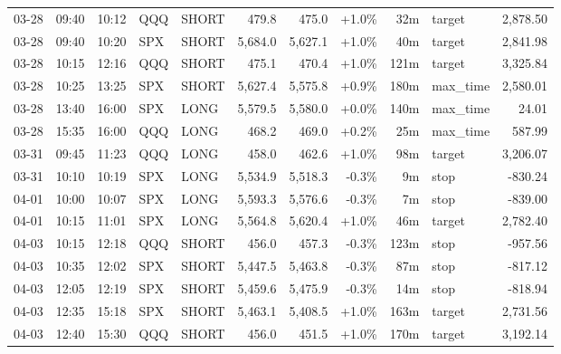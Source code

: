 \documentclass[11pt,a4paper,twoside]{article}
\begin{document}
\begin{center}
\begin{longtable}{>{\color{txtmain}}l l l l l r r r r >{\color{txtmain}}l r}
03-28 & 09:40 & 10:12 & QQQ & SHORT & 479.8 & 475.0 & \textcolor{wingreen}{+1.0\%} & 32m & target & \textcolor{wingreen}{2,878.50} \\
03-28 & 09:40 & 10:20 & SPX & SHORT & 5,684.0 & 5,627.1 & \textcolor{wingreen}{+1.0\%} & 40m & target & \textcolor{wingreen}{2,841.98} \\
03-28 & 10:15 & 12:16 & QQQ & SHORT & 475.1 & 470.4 & \textcolor{wingreen}{+1.0\%} & 121m & target & \textcolor{wingreen}{3,325.84} \\
03-28 & 10:25 & 13:25 & SPX & SHORT & 5,627.4 & 5,575.8 & \textcolor{wingreen}{+0.9\%} & 180m & max\_time & \textcolor{wingreen}{2,580.01} \\
03-28 & 13:40 & 16:00 & SPX & LONG & 5,579.5 & 5,580.0 & \textcolor{wingreen}{+0.0\%} & 140m & max\_time & \textcolor{wingreen}{24.01} \\
03-28 & 15:35 & 16:00 & QQQ & LONG & 468.2 & 469.0 & \textcolor{wingreen}{+0.2\%} & 25m & max\_time & \textcolor{wingreen}{587.99} \\
03-31 & 09:45 & 11:23 & QQQ & LONG & 458.0 & 462.6 & \textcolor{wingreen}{+1.0\%} & 98m & target & \textcolor{wingreen}{3,206.07} \\
03-31 & 10:10 & 10:19 & SPX & LONG & 5,534.9 & 5,518.3 & \textcolor{lossred}{-0.3\%} & 9m & stop & \textcolor{lossred}{-830.24} \\
04-01 & 10:00 & 10:07 & SPX & LONG & 5,593.3 & 5,576.6 & \textcolor{lossred}{-0.3\%} & 7m & stop & \textcolor{lossred}{-839.00} \\
04-01 & 10:15 & 11:01 & SPX & LONG & 5,564.8 & 5,620.4 & \textcolor{wingreen}{+1.0\%} & 46m & target & \textcolor{wingreen}{2,782.40} \\
04-03 & 10:15 & 12:18 & QQQ & SHORT & 456.0 & 457.3 & \textcolor{lossred}{-0.3\%} & 123m & stop & \textcolor{lossred}{-957.56} \\
04-03 & 10:35 & 12:02 & SPX & SHORT & 5,447.5 & 5,463.8 & \textcolor{lossred}{-0.3\%} & 87m & stop & \textcolor{lossred}{-817.12} \\
04-03 & 12:05 & 12:19 & SPX & SHORT & 5,459.6 & 5,475.9 & \textcolor{lossred}{-0.3\%} & 14m & stop & \textcolor{lossred}{-818.94} \\
04-03 & 12:35 & 15:18 & SPX & SHORT & 5,463.1 & 5,408.5 & \textcolor{wingreen}{+1.0\%} & 163m & target & \textcolor{wingreen}{2,731.56} \\
04-03 & 12:40 & 15:30 & QQQ & SHORT & 456.0 & 451.5 & \textcolor{wingreen}{+1.0\%} & 170m & target & \textcolor{wingreen}{3,192.14} \\

\end{longtable}
\end{center}
\end{document}
